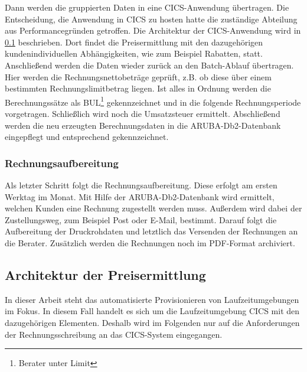 Dann werden die gruppierten Daten in eine CICS-Anwendung übertragen. Die Entscheidung, die Anwendung in CICS zu hosten hatte die zuständige Abteilung aus Performancegründen getroffen.
Die Architektur der CICS-Anwendung wird in \ref{rechArch} beschrieben.
Dort findet die Preisermittlung mit den dazugehörigen kundenindividuellen Abhängigkeiten, wie zum Beispiel Rabatten, statt.
Anschließend werden die Daten wieder zurück an den Batch-Ablauf übertragen.
Hier werden die Rechnungsnettobeträge geprüft, z.B. ob diese über einem bestimmten Rechnungslimitbetrag liegen.
Ist alles in Ordnung werden die Berechnungssätze als BUL\footnote{Berater unter Limit} gekennzeichnet und in die folgende Rechnungsperiode vorgetragen.
Schließlich wird noch die Umsatzsteuer ermittelt.
Abschließend werden die neu erzeugten Berechnungsdaten in die ARUBA-Db2-Datenbank eingepflegt und entsprechend gekennzeichnet.

\subsubsection{Rechnungsaufbereitung}
Als letzter Schritt folgt die Rechnungsaufbereitung.
Diese erfolgt am ersten Werktag im Monat.
Mit Hilfe der ARUBA-Db2-Datenbank wird ermittelt, welchen Kunden eine Rechnung zugestellt werden muss.
Außerdem wird dabei der Zustellungsweg, zum Beispiel Post oder E-Mail, bestimmt.
Darauf folgt die Aufbereitung der Druckrohdaten und letztlich das Versenden der Rechnungen an die Berater.
Zusätzlich werden die Rechnungen noch im PDF-Format archiviert.

\subsection{Architektur der Preisermittlung}\label{rechArch}
In dieser Arbeit steht das automatisierte Provisionieren von Laufzeitumgebungen im Fokus.
In diesem Fall handelt es sich um die Laufzeitumgebung CICS mit den dazugehörigen Elementen.
Deshalb wird im Folgenden nur auf die Anforderungen der Rechnungsschreibung an das CICS-System eingegangen.


